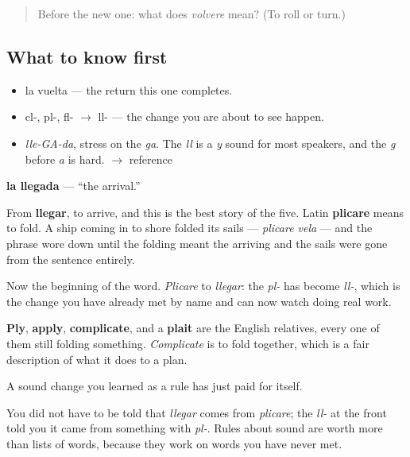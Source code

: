 \label{lesson:ES-C288-llegada}



\begin{quote}
Before the new one: what does \emph{volvere} mean? (To roll or turn.)
\end{quote}

\subsection*{What to know first}
\begin{itemize}
\raggedright
  \item la vuelta — the return this one completes.
  \item cl-, pl-, fl- $\to$ ll- — the change you are about to see happen.
\end{itemize}

\begin{sounds}
\begin{itemize}
\raggedright
  \item \emph{lle-GA-da}, stress on the \emph{ga}. The \emph{ll} is a \emph{y} sound for most speakers, and the \emph{g} before \emph{a} is hard. $\to$ reference
\end{itemize}
\end{sounds}

\begin{cousinweb}
\textbf{la llegada} — \textquotedblleft{}the arrival.\textquotedblright{}

From \textbf{llegar}, to arrive, and this is the best story of the five. Latin \textbf{plicare} means to fold. A ship coming in to shore folded its sails — \emph{plicare vela} — and the phrase wore down until the folding meant the arriving and the sails were gone from the sentence entirely.

Now the beginning of the word. \emph{Plicare} to \emph{llegar}: the \emph{pl-} has become \emph{ll-}, which is the change you have already met by name and can now watch doing real work.

\textbf{Ply}, \textbf{apply}, \textbf{complicate}, and a \textbf{plait} are the English relatives, every one of them still folding something. \emph{Complicate} is to fold together, which is a fair description of what it does to a plan.
\end{cousinweb}

\begin{grammarlens}[title={What you've built}]
A sound change you learned as a rule has just paid for itself.

You did not have to be told that \emph{llegar} comes from \emph{plicare}; the \emph{ll-} at the front told you it came from something with \emph{pl-}. Rules about sound are worth more than lists of words, because they work on words you have never met.
\end{grammarlens}

